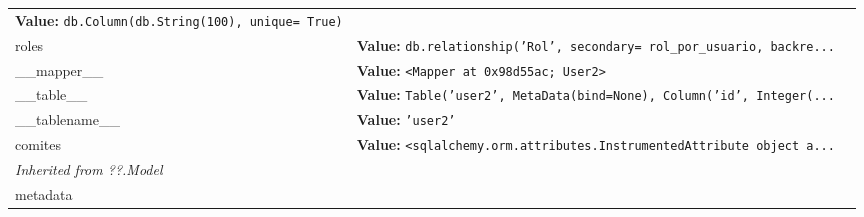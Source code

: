 \begin{longtable}{|p{\varnamewidth}|p{\vardescrwidth}|l}
\textbf{Value:} 
{\tt db.Column(db.String(100), unique= True)}&\\
\cline{1-2}
\raggedright r\-o\-l\-e\-s\- & \raggedright \textbf{Value:} 
{\tt db.relationship('Rol', secondary= rol\_por\_usuario, backre\texttt{...}}&\\
\cline{1-2}
\raggedright \_\-\_\-m\-a\-p\-p\-e\-r\-\_\-\_\- & \raggedright \textbf{Value:} 
{\tt {\textless}Mapper at 0x98d55ac; User2{\textgreater}}&\\
\cline{1-2}
\raggedright \_\-\_\-t\-a\-b\-l\-e\-\_\-\_\- & \raggedright \textbf{Value:} 
{\tt Table('user2', MetaData(bind=None), Column('id', Integer(\texttt{...}}&\\
\cline{1-2}
\raggedright \_\-\_\-t\-a\-b\-l\-e\-n\-a\-m\-e\-\_\-\_\- & \raggedright \textbf{Value:} 
{\tt \texttt{'}\texttt{user2}\texttt{'}}&\\
\cline{1-2}
\raggedright c\-o\-m\-i\-t\-e\-s\- & \raggedright \textbf{Value:} 
{\tt {\textless}sqlalchemy.orm.attributes.InstrumentedAttribute object a\texttt{...}}&\\
\cline{1-2}
\multicolumn{2}{|l|}{\textit{Inherited from ??.Model}}\\
\multicolumn{2}{|p{\varwidth}|}{\raggedright metadata}\\
\cline{1-2}
\end{longtable}

